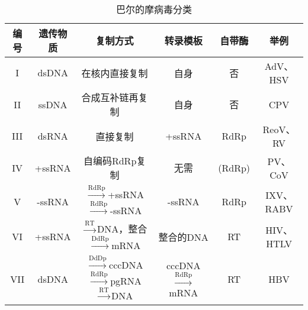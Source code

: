 

\begin{landscape}
	\begin{table}[]
		\centering
		\begin{tabular}{|c|c|c|c|c|c|}
			\hline
			编号 & 遗传物质 & 复制方式 & 转录模板 & 自带酶 & 举例 \\ \hline
			I & dsDNA & 在核内直接复制 & 自身 & 否 & AdV、HSV \\ \hline
			II & ssDNA & 合成互补链再复制 & 自身 & 否 & CPV \\ \hline
			III & dsRNA & 直接复制 & +ssRNA & RdRp & ReoV、RV \\ \hline
			IV & +ssRNA & 自编码RdRp复制 & 无需 & (RdRp) & PV、CoV \\ \hline
			V & -ssRNA & $\xrightarrow{\text{RdRp}}$+ssRNA$\xrightarrow{\text{RdRp}}$-ssRNA & -ssRNA & RdRp & IXV、RABV \\ \hline
			VI & +ssRNA & $\xrightarrow{\text{RT}}$DNA，整合$\xrightarrow{\text{DdRp}}$mRNA & 整合的DNA & RT & HIV、HTLV \\ \hline
			VII & dsDNA & $\xrightarrow{\text{DdDp}}$cccDNA$\xrightarrow{\text{RdRp}}$pgRNA$\xrightarrow{\text{RT}}$DNA & cccDNA$\xrightarrow{\text{RdRp}}$mRNA & RT & HBV \\ \hline
		\end{tabular}
		\caption{巴尔的摩病毒分类}
		\label{tab:巴尔的摩病毒分类}
	\end{table}
\end{landscape}